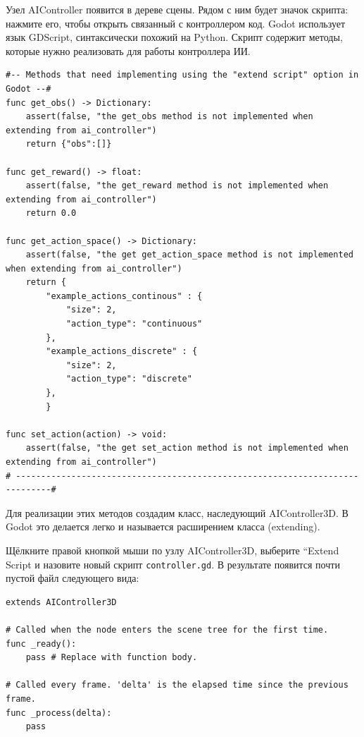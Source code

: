 \documentclass[11pt,a4paper]{article}
\begin{document}

Узел AIController появится в дереве сцены. Рядом с ним будет значок скрипта: нажмите его, чтобы открыть связанный с контроллером код. Godot использует язык GDScript, синтаксически похожий на Python. Скрипт содержит методы, которые нужно реализовать для работы контроллера ИИ.

\begin{lstlisting}
#-- Methods that need implementing using the "extend script" option in Godot --#
func get_obs() -> Dictionary:
	assert(false, "the get_obs method is not implemented when extending from ai_controller")
	return {"obs":[]}

func get_reward() -> float:
	assert(false, "the get_reward method is not implemented when extending from ai_controller")
	return 0.0

func get_action_space() -> Dictionary:
	assert(false, "the get get_action_space method is not implemented when extending from ai_controller")
	return {
		"example_actions_continous" : {
			"size": 2,
			"action_type": "continuous"
		},
		"example_actions_discrete" : {
			"size": 2,
			"action_type": "discrete"
		},
		}

func set_action(action) -> void:
	assert(false, "the get set_action method is not implemented when extending from ai_controller")
# -----------------------------------------------------------------------------#
\end{lstlisting}

Для реализации этих методов создадим класс, наследующий AIController3D. В Godot это делается легко и называется расширением класса (extending).

Щёлкните правой кнопкой мыши по узлу AIController3D, выберите ``Extend Script и назовите новый скрипт \texttt{controller.gd}. В результате появится почти пустой файл следующего вида:

\begin{lstlisting}
extends AIController3D

# Called when the node enters the scene tree for the first time.
func _ready():
	pass # Replace with function body.

# Called every frame. 'delta' is the elapsed time since the previous frame.
func _process(delta):
	pass
\end{lstlisting}
\end{document}
